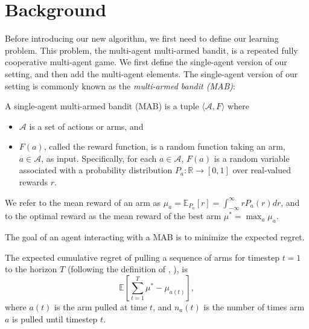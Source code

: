 \documentclass{article}
\def\hado#1{\textcolor{RubineRed}{\textbf{Hado: ``#1''}}}
\begin{document}


\section{Background}\label{sec:bg}
Before introducing our new algorithm, we first need to define our learning problem. This problem, the multi-agent multi-armed bandit, is a repeated fully cooperative multi-agent game. We first define the single-agent version of our setting, and then add the multi-agent elements. The single-agent version of our setting is commonly known as the \emph{multi-armed bandit (MAB)}:
\begin{definition}
A single-agent multi-armed bandit (MAB) \cite{thompson1933likelihood} is a tuple $\langle \mathcal{A},F\rangle$ where
\begin{itemize}
\item $\mathcal{A}$ is a set of actions or arms, and
\item $F(a)$, called the reward function, is a random function taking an arm,  $a \in \mathcal{A}$, as input. Specifically, for each $a \in \mathcal{A}$, $F(a)$ is a random variable associated with a probability distribution $P_a : \mathbb{R} \rightarrow [0,1] $ over real-valued rewards $r$.
\end{itemize}
We refer to the mean reward of an arm as $\mu_a = \mathbb{E}_{P_a}[r] = \int_{-\infty}^{\infty} r P_a(r) dr$, and to the optimal reward as {the mean reward of the best arm} $\mu^* = \max_a \mu_a$. %
\end{definition}
The goal of an agent interacting with a MAB is to minimize the expected regret.
\begin{definition}
The {expected} cumulative regret of pulling a sequence of arms for timestep $t=1$  to the {horizon} $T$ (following the definition of \citeauthor{agrawal2012analysis}, \citeyear{agrawal2012analysis}), is
\[
\mathbb{E}\left[ \sum_{t=1}^{T} \mu^* - \mu_{a(t)}\right], %
\]
where $a(t)$ is the arm pulled at time $t$, and $n_a(t)$ is the number of times arm $a$ is pulled until timestep $t$.
\end{definition}
\end{document}

